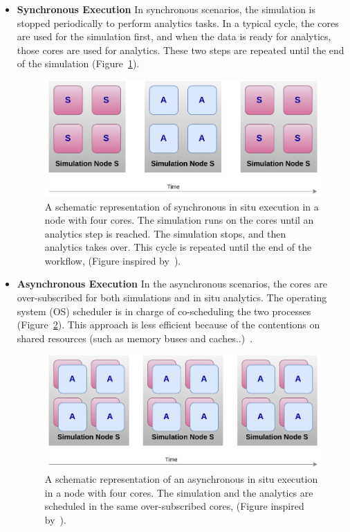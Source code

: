 \begin{itemize}
    \item \textbf{Synchronous Execution}
    In synchronous scenarios, the simulation is stopped periodically to perform analytics tasks. In a typical cycle, the cores are used for the simulation first, and when the data is ready for analytics, those cores are used for analytics. These two steps are repeated until the end of the simulation (Figure~\ref{figinsitusynch}).
    
    \begin{figure}[h!]\centering
    \includegraphics[scale=0.9]{figures/insitu_synchronous.pdf}
    \caption{A schematic representation of synchronous in situ execution in a node with four cores. The simulation runs on the cores until an analytics step is reached. The simulation stops, and then analytics takes over. This cycle is repeated until the end of the workflow, (Figure inspired by~\cite{Estelle_integration_2018}).}
    \label{figinsitusynch}
    \end{figure}


    \item \textbf{Asynchronous Execution}
    In the asynchronous scenarios, the cores are over-subscribed for both simulations and in situ analytics. The operating system (OS) scheduler is in charge of co-scheduling the two processes (Figure~\ref{figinsituasynch}). This approach is less efficient because of the contentions on shared resources (such as memory buses and caches..)~\cite{zheng2013goldrush, Estelle_integration_2018}. 

    \begin{figure}[h!]\centering
    \includegraphics[scale=0.9]{figures/insitu_asynch.pdf}
    \caption{A schematic representation of an asynchronous in situ execution in a node with four cores. The simulation and the analytics are scheduled in the same over-subscribed cores, (Figure inspired by~\cite{Estelle_integration_2018}).}
    \label{figinsituasynch}
    \end{figure}


\end{itemize}
